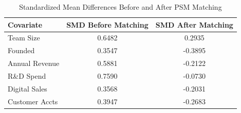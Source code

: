 \documentclass[12pt]{article}
\begin{document}
 

\begin{table}[h!]
\centering
\caption{Standardized Mean Differences Before and After PSM Matching}
\begin{tabular}{lcc}
\toprule
Covariate & SMD Before Matching & SMD After Matching \\
\midrule
Team Size       & 0.6482  & 0.2935  \\
Founded         & 0.3547  & -0.3895 \\
Annual Revenue  & 0.5881  & -0.2122 \\
R\&D Spend      & 0.7590  & -0.0730 \\
Digital Sales   & 0.3568  & -0.2031 \\
Customer Accts  & 0.3947  & -0.2683 \\
\bottomrule
\end{tabular}
\end{table}
\end{document}

